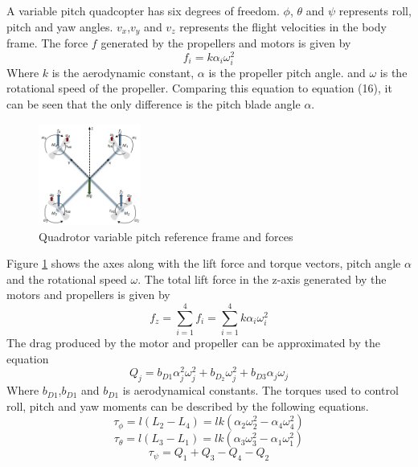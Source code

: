 A variable pitch quadcopter has six degrees of freedom. $\phi$, $\theta$ and $\psi$ represents roll, pitch and yaw angles. $v_x$,$v_y$ and $v_z$ represents the flight velocities in the body frame. The force $f$ generated by the propellers and motors is given by
\begin{equation}
    f_{i} = k\alpha_i\omega_i^2
\end{equation}
Where $k$ is the aerodynamic constant,  $\alpha$ is the propeller pitch angle. and $\omega$ is the rotational speed of the propeller. Comparing this equation to equation (16), it can be seen that the only difference is the pitch blade angle $\alpha$.
\begin{figure}[H]
    \centering
    \includegraphics[width = 0.3\textwidth]{VAPIQ-PICTURES/MMVPQ.jpg}
    \caption{Quadrotor variable pitch reference frame and forces}
    \label{fig:ControllInputs}
\end{figure}
\noindent
Figure \ref{fig:ControllInputs} shows the axes along with the lift force and torque vectors, pitch angle $\alpha$ and the rotational speed $\omega$. The total lift force in the z-axis generated by the motors and propellers is given by
\begin{equation}
   f_{z} = \sum_{i=1}^{4} f_{i} = \sum_{i=1}^{4} k\alpha_i\omega_i^2
\end{equation}
The drag produced by the motor and propeller can be approximated by the equation
\begin{equation}
   Q_j = b_{D1}\alpha_j^2\omega_j^2 + b_D_2\omega_j^2 + b_{D3}\alpha_j\omega_j
\end{equation}
Where $b_{D1}$,$b_{D1}$ and $b_{D1}$ is aerodynamical constants. The torques used to control roll, pitch and yaw moments can be described by the following equations.
\begin{equation}
   \tau_\phi = l(L_2-L_4) =lk(\alpha_2\omega_2^2-\alpha_4\omega_4^2)
\end{equation}
\begin{equation}
   \tau_\theta = l(L_3-L_1) = lk(\alpha_3\omega_3^2-\alpha_1\omega_1^2)
\end{equation}
\begin{equation}
   \tau_\psi = Q_1 + Q_3 - Q_4 - Q_2
\end{equation}
